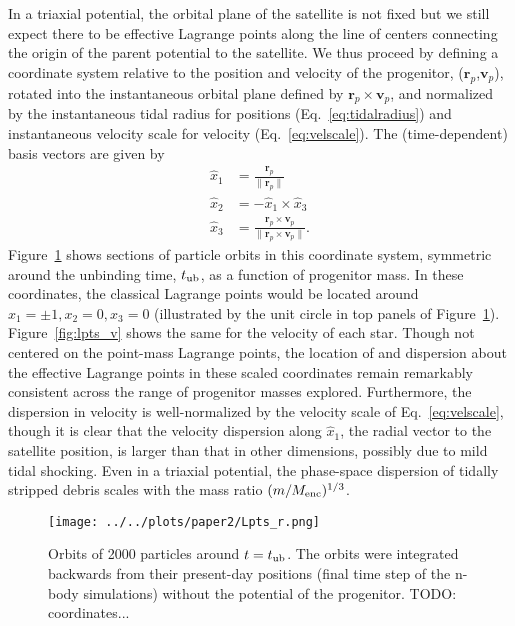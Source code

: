 \documentclass[letterpaper,12pt,preprint]{aastex}
\newcommand{\bs}{\boldsymbol}
\newcommand{\tub}{t_{\rm ub}}
\begin{document}
In a triaxial potential, the orbital plane of the satellite is not fixed but we still expect there to be effective Lagrange points along the line of centers connecting the origin of the parent potential to the satellite. We thus proceed by defining a coordinate system relative to the position and velocity of the progenitor, ($\bs{r}_p$,$\bs{v}_p$), rotated into the instantaneous orbital plane defined by $\bs{r}_p \times \bs{v}_p$, and normalized by the instantaneous tidal radius for positions (Eq.~\ref{eq:tidalradius}) and instantaneous velocity scale for velocity (Eq.~\ref{eq:velscale}). 
The (time-dependent) basis vectors are given by
\begin{align}
	\hat{x}_1 &= \frac{\bs{r}_p}{\|\bs{r}_p\|}\\
	\hat{x}_2 &= -\hat{x}_1 \times \hat{x}_3\\
	\hat{x}_3 &= \frac{\bs{r}_p \times \bs{v}_p}{\|\bs{r}_p \times \bs{v}_p\|}.
\end{align}
Figure~\ref{fig:lpts_r} shows sections of particle orbits in this coordinate system, symmetric around the unbinding time, $\tub$, as a function of progenitor mass. In these coordinates, the classical Lagrange points would be located around $x_1=\pm1,x_2=0,x_3=0$ (illustrated by the unit circle in top panels of Figure~\ref{fig:lpts_r}). Figure~\ref{fig:lpts_v} shows the same for the velocity of each star. Though not centered on the point-mass Lagrange points, the location of and dispersion about the effective Lagrange points in these scaled coordinates remain remarkably consistent across the range of progenitor masses explored. Furthermore, the dispersion in velocity is well-normalized by the velocity scale of Eq.~\ref{eq:velscale}, though it is clear that the velocity dispersion along $\hat{x}_1$, the radial vector to the satellite position, is larger than that in other dimensions, possibly due to mild tidal shocking. Even in a triaxial potential, the phase-space dispersion of tidally stripped debris scales with the mass ratio $(m / M_{\rm enc})^{1/3}$. %

\begin{figure}[h]
\begin{center}
\texttt{[image: ../../plots/paper2/Lpts\_r.png]}
\caption{ Orbits of 2000 particles around $t=\tub$. The orbits were integrated backwards from their present-day positions (final time step of the n-body simulations) without the potential of the progenitor. TODO: coordinates...}\label{fig:lpts_r}
\end{center}
\end{figure}
\end{document}
